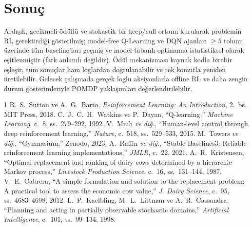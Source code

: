 \documentclass[conference]{IEEEtran}
\begin{document}
\section{Sonuç}
Ardışık, gecikmeli-ödüllü ve stokastik bir keep/cull ortamı kurularak problemin RL
gerektirdiği gösterilmiş; model-free Q-Learning ve DQN ajanları $\geq5$ tohum üzerinde
tüm baseline'ları geçmiş ve model-tabanlı optimuma istatistiksel olarak eşitlenmiştir (fark anlamlı değildir). Ödül mekanizması
kaynak kodla birebir eşleşir, tüm sonuçlar ham loglardan doğrulanabilir ve tek komutla
yeniden üretilebilir. Gelecek çalışmada gerçek loglu aksiyonlarla offline RL ve daha zengin
durum gösterimleriyle POMDP yaklaşımları değerlendirilebilir.

\begin{thebibliography}{1}
 R.~S.~Sutton ve A.~G.~Barto, \emph{Reinforcement Learning: An Introduction}, 2.~bs. MIT Press, 2018.
 C.~J.~C.~H.~Watkins ve P.~Dayan, ``Q-learning,'' \emph{Machine Learning}, c.~8, ss.~279--292, 1992.
 V.~Mnih \emph{ve di\u{g}.}, ``Human-level control through deep reinforcement learning,'' \emph{Nature}, c.~518, ss.~529--533, 2015.
 M.~Towers \emph{ve di\u{g}.}, ``Gymnasium,'' Zenodo, 2023.
 A.~Raffin \emph{ve di\u{g}.}, ``Stable-Baselines3: Reliable reinforcement learning implementations,'' \emph{JMLR}, c.~22, 2021.
 A.~R.~Kristensen, ``Optimal replacement and ranking of dairy cows determined by a hierarchic Markov process,'' \emph{Livestock Production Science}, c.~16, ss.~131--144, 1987.
 V.~E.~Cabrera, ``A simple formulation and solution to the replacement problem: A practical tool to assess the economic cow value,'' \emph{J. Dairy Science}, c.~95, ss.~4683--4698, 2012.
 L.~P.~Kaelbling, M.~L.~Littman ve A.~R.~Cassandra, ``Planning and acting in partially observable stochastic domains,'' \emph{Artificial Intelligence}, c.~101, ss.~99--134, 1998.
\end{thebibliography}
\end{document}
